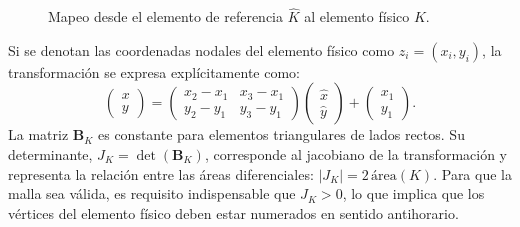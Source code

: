 \documentclass[12pt, letterpaper]{report}
\theoremstyle{definition}
\begin{document}
\begin{figure}[h!]
    \centering
    \caption{Mapeo desde el elemento de referencia $\hat{K}$ al elemento físico $K$.}
    \label{fig:mapeo_referencia}
\end{figure}

Si se denotan las coordenadas nodales del elemento físico como $z_i = (x_i, y_i)$, la transformación se expresa explícitamente como:
\[
\begin{pmatrix} x \\ y \end{pmatrix} = 
\begin{pmatrix} x_2-x_1 & x_3-x_1 \\ y_2-y_1 & y_3-y_1 \end{pmatrix}
\begin{pmatrix} \hat{x} \\ \hat{y} \end{pmatrix}
+
\begin{pmatrix} x_1 \\ y_1 \end{pmatrix}.
\]
La matriz $\mathbf{B}_K$ es constante para elementos triangulares de lados rectos. Su determinante, $J_K = \det(\mathbf{B}_K)$, corresponde al jacobiano de la transformación y representa la relación entre las áreas diferenciales: $|J_K| = 2 \, \text{área}(K)$. Para que la malla sea válida, es requisito indispensable que $J_K > 0$, lo que implica que los vértices del elemento físico deben estar numerados en sentido antihorario.
\end{document}
